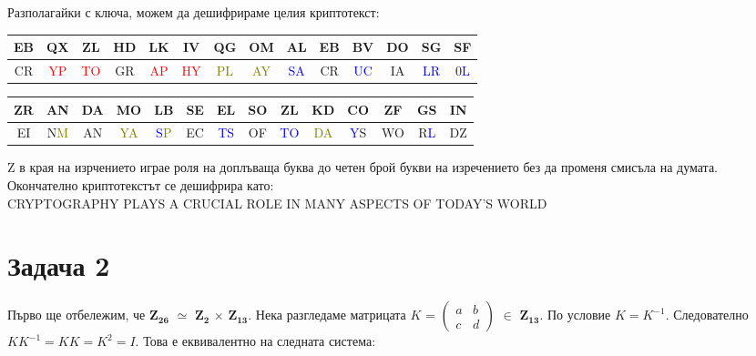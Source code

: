 \documentclass{article}
\begin{document}
\justify
Разполагайки с ключа, можем да дешифрираме целия криптотекст:

\begin{center}
\begin{tabular}{|c|c|c|c|c|c|c|c|c|c|c|c|c|c|}
        \hline
        EB & QX & ZL & HD & LK & IV & QG & OM & AL & EB & BV & DO & SG & SF \\
        \hline
        CR & \textcolor{red}{YP} & \textcolor{red}{TO} & GR & \textcolor{red}{AP} & \textcolor{red}{HY} & \textcolor{olive}{PL} & \textcolor{olive}{AY} & \textcolor{blue}{SA} & CR & \textcolor{blue}{UC} & IA & \textcolor{blue}{LR} & 0\textcolor{blue}{L} \\
        \hline
        \end{tabular}
\end{center}

\begin{center}
\begin{tabular}{|c|c|c|c|c|c|c|c|c|c|c|c|c|c|}
        \hline
        ZR & AN & DA & MO & LB & SE & EL & SO & ZL & KD & CO & ZF & GS & IN \\
        \hline
        EI & N\textcolor{olive}{M} & AN & \textcolor{olive}{YA} & \textcolor{blue}{S}\textcolor{olive}{P} & EC & \textcolor{blue}{TS} & OF & \textcolor{blue}{TO} & \textcolor{olive}{DA} & \textcolor{blue}{Y}S & WO & R\textcolor{blue}{L} & DZ \\
        \hline
        \end{tabular}
\end{center}

\justify
Z в края на изрчението играе роля на доплъваща буква до четен брой букви на изречението без да променя смисъла на думата. Окончателно криптотекстът се дешифрира като: \\

\justify
CRYPTOGRAPHY PLAYS A CRUCIAL ROLE IN MANY ASPECTS OF TODAY'S WORLD

\section*{Задача 2}

\justify
Първо ще отбележим, че $\mathbf{Z_{26}}$ $\simeq$ $\mathbf{Z_2}$ $\times$ $\mathbf{Z_{13}}$. Нека разгледаме матрицата $K$ = $\begin{pmatrix}
                             a & b \\
                             c & d
                         \end{pmatrix}$
                         $\in$ $\mathbf{Z_{13}}$. 
По условие $K = K^{-1}$. Следователно $KK^{-1} = KK = K^2 = I$. Това е еквивалентно на следната система: 
\end{document}
